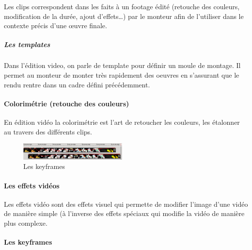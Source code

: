 Les clips correspondent dans les faits à un footage édité (retouche
des couleurs, modification de la durée, ajout d'effets\ldots) par le
monteur afin de l'utiliser dans le contexte précis d'une œuvre finale.

\subparagraph{Les templates}

Dans l'édition video, on parle de template pour définir un moule de
montage.  Il permet au monteur de monter très rapidement des oeuvres
en s'assurant que le rendu rentre dans un cadre défini précédemment.

\paragraph{Colorimétrie (retouche des couleurs)}

En édition vidéo la colorimétrie est l'art de retoucher les couleurs,
les étalonner au travers des différents clips.

\begin{figure}

   \vspace{-20pt}

    \begin{center}

      \includegraphics[width=0.48\textwidth]{images/keyframecurves}

    \end{center}

   \vspace{-30pt} \caption{Les keyframes} \vspace{-10pt} \label{Yes}

\end{figure}

\paragraph{Les effets vidéos}

Les effets vidéo sont des effets visuel qui permette de modifier l'image
d'une vidéo de manière simple (à l'inverse des effets spéciaux qui
modifie la vidéo de manière plus complexe.

\paragraph{Les keyframes}

